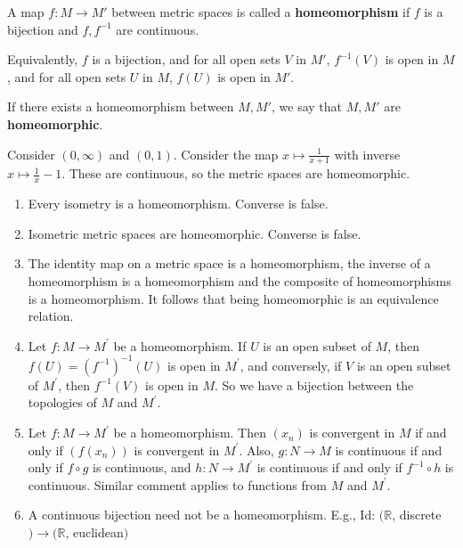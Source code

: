 \documentclass[a4paper,11pt]{article}
\begin{document}
\begin{definition}
	A map \( f \colon M \to M' \) between metric spaces is called a \textbf{homeomorphism} if \( f \) is a bijection and \( f, f^{-1} \) are continuous.

	Equivalently, \( f \) is a bijection, and for all open sets \( V \) in \( M' \), \( f^{-1}(V) \) is open in \( M \), and for all open sets \( U \) in \( M \), \( f(U) \) is open in \( M' \).

	If there exists a homeomorphism between \( M, M' \), we say that \( M, M' \) are \textbf{homeomorphic}.
\end{definition}
\begin{example}
	Consider \( (0,\infty) \) and \( (0,1) \).
	Consider the map \( x \mapsto \frac{1}{x+1} \) with inverse \( x \mapsto \frac{1}{x} - 1 \).
	These are continuous, so the metric spaces are homeomorphic.
\end{example}
\begin{remark}
\begin{enumerate}
    \item Every isometry is a homeomorphism. Converse is false.
    \item Isometric metric spaces are homeomorphic. Converse is false.
    \item The identity map on a metric space is a homeomorphism, the inverse of a homeomorphism is a homeomorphism and the composite of homeomorphisms is a homeomorphism. It follows that being homeomorphic is an equivalence relation.
    \item Let $f: M \rightarrow M^{\prime}$ be a homeomorphism. If $U$ is an open subset of $M$, then $f(U)=\left(f^{-1}\right)^{-1}(U)$ is open in $M^{\prime}$, and conversely, if $V$ is an open subset of $M^{\prime}$, then $f^{-1}(V)$ is open in $M$. So we have a bijection between the topologies of $M$ and $M^{\prime}$.
    \item Let $f: M \rightarrow M^{\prime}$ be a homeomorphism. Then $\left(x_n\right)$ is convergent in $M$ if and only if $\left(f\left(x_n\right)\right)$ is convergent in $M^{\prime}$. Also, $g: N \rightarrow M$ is continuous if and only if $f \circ g$ is continuous, and $h: N \rightarrow M^{\prime}$ is continuous if and only if $f^{-1} \circ h$ is continuous. Similar comment applies to functions from $M$ and $M^{\prime}$.
    \item A continuous bijection need not be a homeomorphism. E.g.,
    Id: $(\mathbb{R}$, discrete$) \rightarrow(\mathbb{R}$, euclidean$)$
\end{enumerate}
\end{remark}
\end{document}
